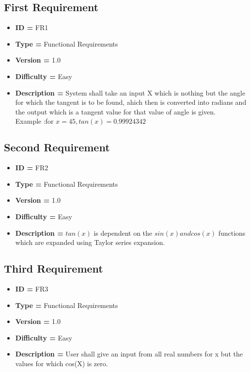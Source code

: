 \documentclass[a4paper, 11pt]{article}
\begin{document}
    \subsection*{First Requirement}
    \begin{itemize}
        \item \textbf{ID = } FR1
        \item \textbf{Type = } Functional Requirements
        \item \textbf{Version = } 1.0
        \item \textbf{Difficulty = } Easy
        \item \textbf{Description = }System shall take an input X which is nothing but the angle for which the tangent is to be found, ahich then is converted into radians and the output which is a tangent value for that value of angle is given. \\
        Example :for  $x = 45, tan(x) = 0.99924342$
    \end{itemize}
    \subsection*{Second Requirement}
    \begin{itemize}
        \item \textbf{ID = } FR2
        \item \textbf{Type = } Functional Requirements
        \item \textbf{Version = } 1.0
        \item \textbf{Difficulty = } Easy
        \item \textbf{Description = } $tan(x)$ is dependent on the $sin(x) and cos(x)$ functions which are expanded using Taylor series expansion.\\
    \end{itemize}
    \subsection*{Third Requirement}
    \begin{itemize}
        \item \textbf{ID = } FR3
        \item \textbf{Type = } Functional Requirements
        \item \textbf{Version = } 1.0
        \item \textbf{Difficulty = } Easy
        \item \textbf{Description = }  User shall give an input from all real numbers for x but the values for which cos(X) is zero.  
    \end{itemize}
\end{document}
